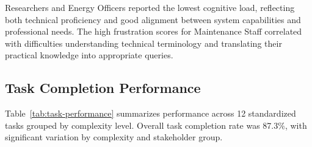 \documentclass[acmlarge]{acmart}
\begin{document}
Researchers and Energy Officers reported the lowest cognitive load, reflecting both technical proficiency and good alignment between system capabilities and professional needs. The high frustration scores for Maintenance Staff correlated with difficulties understanding technical terminology and translating their practical knowledge into appropriate queries.

\subsection{Task Completion Performance}

Table~\ref{tab:task-performance} summarizes performance across 12 standardized tasks grouped by complexity level. Overall task completion rate was 87.3\%, with significant variation by complexity and stakeholder group.
\end{document}
